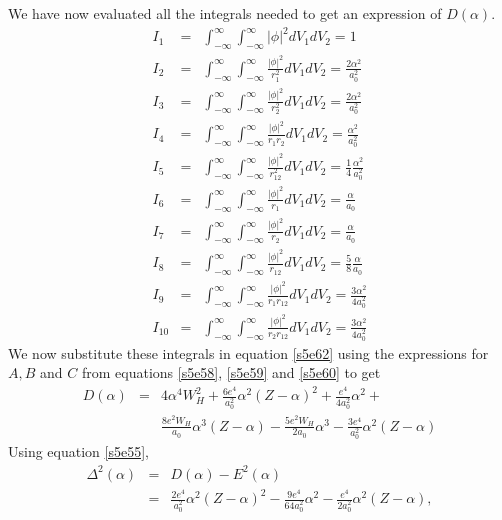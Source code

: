 \documentclass{article}
\numberwithin{equation}{section}
\begin{document}
We have now evaluated all the integrals needed to get an expression of
$D(\alpha)$.
\begin{eqnarray}
I_1 &=& \int_{-\infty}^\infty\int_{-\infty}^\infty |\phi|^2 dV_1 dV_2 
 = 1 \label{s5e83} \\
I_2 &=& \int_{-\infty}^\infty\int_{-\infty}^\infty\frac{|\phi|^2}{r_1^2}
        dV_1dV_2 = \frac{2\alpha^2}{a_0^2} \label{s5e84}\\
I_3 &=& \int_{-\infty}^\infty\int_{-\infty}^\infty\frac{|\phi|^2}{r_2^2}
        dV_1dV_2 = \frac{2\alpha^2}{a_0^2} \label{s5e85}\\
I_4 &=& \int_{-\infty}^\infty\int_{-\infty}^\infty\frac{|\phi|^2}{r_1r_2}
        dV_1dV_2 = \frac{\alpha^2}{a_0^2} \label{s5e86}\\
I_5 &=& \int_{-\infty}^\infty\int_{-\infty}^\infty\frac{|\phi|^2}{r_{12}^2}
        dV_1dV_2 = \frac{1}{4}\frac{\alpha^2}{a_0^2} \label{s5e87}\\
I_6 &=& \int_{-\infty}^\infty\int_{-\infty}^\infty\frac{|\phi|^2}{r_1}
        dV_1dV_2 = \frac{\alpha}{a_0} \label{s5e88} \\
I_7 &=& \int_{-\infty}^\infty\int_{-\infty}^\infty\frac{|\phi|^2}{r_2}
        dV_1dV_2 = \frac{\alpha}{a_0} \label{s5e89} \\
I_8 &=& \int_{-\infty}^\infty\int_{-\infty}^\infty\frac{|\phi|^2}{r_{12}}
        dV_1dV_2 = \frac{5}{8}\frac{\alpha}{a_0} \label{s5e90}\\
I_9 &=& \int_{-\infty}^\infty\int_{-\infty}^\infty\frac{|\phi|^2}
        {r_1r_{12}}dV_1dV_2 = \frac{3\alpha^2}{4a_0^2} \label{s5e91}\\
I_{10} &=& \int_{-\infty}^\infty\int_{-\infty}^\infty\frac{|\phi|^2}
        {r_2r_{12}}dV_1dV_2 = \frac{3\alpha^2}{4a_0^2} \label{s5e92}
\end{eqnarray}
We now substitute these integrals in equation \eqref{s5e62} using the
expressions for $A, B$ and $C$ from equations \eqref{s5e58}, 
\eqref{s5e59} and \eqref{s5e60} to get
\begin{eqnarray}
D(\alpha) &=& 4\alpha^4W_H^2 + \frac{6e^4}{a_0^2}\alpha^2(Z - \alpha)^2
 + \frac{e^4}{4a_0^2}\alpha^2 + \nonumber \\
 & & \frac{8e^2W_H}{a_0}\alpha^3(Z - \alpha) - \frac{5e^2W_H}{2a_0}
 \alpha^3 - \frac{3e^4}{a_0^2}\alpha^2(Z - \alpha) \label{s5e93}
\end{eqnarray}
Using equation \eqref{s5e55},
\begin{eqnarray}
\Delta^2(\alpha) &=& D(\alpha) - E^2(\alpha) \nonumber \\
 &=& \frac{2e^4}{a_0^2}\alpha^2(Z - \alpha)^2 - \frac{9e^4}{64a_0^2}
 \alpha^2 - \frac{e^4}{2a_0^2}\alpha^2(Z - \alpha) \label{s5e94},
\end{eqnarray}
\end{document}
